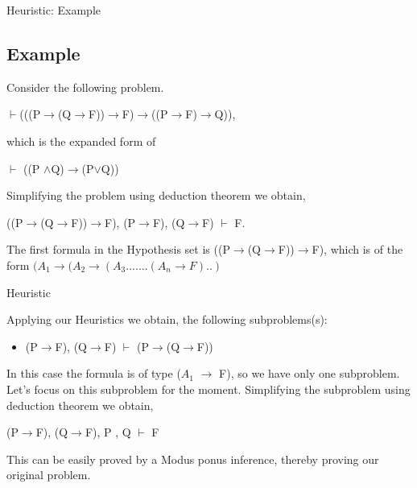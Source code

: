 \documentclass{beamer}
\begin{document}
\begin{frame}{Heuristic: Example}


\subsection{Example}
Consider the following problem. \newline

\begin{center}
$\vdash$(((P$\rightarrow$(Q$\rightarrow$F))$\rightarrow$F)$\rightarrow$((P$\rightarrow$F)$\rightarrow$Q)), 
\end{center}


which is the expanded form of  
\begin{center}
 $\vdash$ ((P $\wedge $Q)$\rightarrow$(P$\vee$Q)) 
\end{center}



Simplifying the problem using deduction theorem we obtain,
\begin{center}
((P$\rightarrow$(Q$\rightarrow$F))$\rightarrow$F), 
(P$\rightarrow$F), 
(Q$\rightarrow$F) $\vdash$ F. \newline
\end{center}


The first formula in the Hypothesis set is ((P$\rightarrow$(Q$\rightarrow$F))$\rightarrow$F), which is of the form $(A_{1}\rightarrow(A_{2}\rightarrow(A_{3}.......(A_{n}\rightarrow F)..)$ 


\end{frame}
\begin{frame}{Heuristic}


Applying our Heuristics we obtain, the following subproblems(s):
  \begin{itemize}
    \item (P$\rightarrow$F),  (Q$\rightarrow$F) $\vdash$ (P$\rightarrow$(Q$\rightarrow$F))
  \end{itemize}


In this case the formula is of type  ($A_{1}$ $\rightarrow$ F), so we have only one subproblem.
Let's focus on this subproblem for the moment. Simplifying the subproblem using deduction theorem we obtain,

\begin{center}
(P$\rightarrow$F),  (Q$\rightarrow$F), P , Q $\vdash$ F \newline
\end{center}

This can be easily proved by a Modus ponus inference, thereby proving our original problem.
\end{frame}
\end{document}
